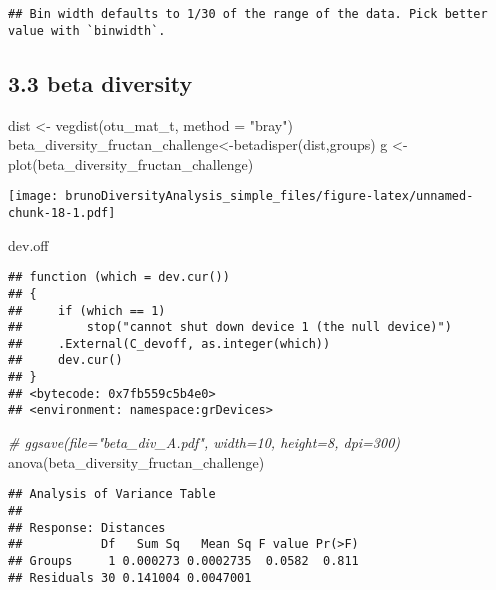 \documentclass[
]{article}
\newenvironment{Shaded}{\begin{snugshade}}{\end{snugshade}}
\newcommand{\AttributeTok}[1]{\textcolor[rgb]{0.77,0.63,0.00}{#1}}
\newcommand{\CommentTok}[1]{\textcolor[rgb]{0.56,0.35,0.01}{\textit{#1}}}
\newcommand{\FunctionTok}[1]{\textcolor[rgb]{0.00,0.00,0.00}{#1}}
\newcommand{\NormalTok}[1]{#1}
\newcommand{\OtherTok}[1]{\textcolor[rgb]{0.56,0.35,0.01}{#1}}
\newcommand{\StringTok}[1]{\textcolor[rgb]{0.31,0.60,0.02}{#1}}
\begin{document}
\begin{verbatim}
## Bin width defaults to 1/30 of the range of the data. Pick better value with `binwidth`.
\end{verbatim}

\hypertarget{beta-diversity-2}{%
\subsection{3.3 beta diversity}\label{beta-diversity-2}}

\begin{Shaded}
\begin{Highlighting}[]
\NormalTok{dist }\OtherTok{\textless{}{-}} \FunctionTok{vegdist}\NormalTok{(otu\_mat\_t, }\AttributeTok{method =} \StringTok{"bray"}\NormalTok{)}
\NormalTok{beta\_diversity\_fructan\_challenge}\OtherTok{\textless{}{-}}\FunctionTok{betadisper}\NormalTok{(dist,groups)}
\NormalTok{g }\OtherTok{\textless{}{-}} \FunctionTok{plot}\NormalTok{(beta\_diversity\_fructan\_challenge)}
\end{Highlighting}
\end{Shaded}

\texttt{[image: brunoDiversityAnalysis\_simple\_files/figure-latex/unnamed-chunk-18-1.pdf]}

\begin{Shaded}
\begin{Highlighting}[]
\NormalTok{dev.off}
\end{Highlighting}
\end{Shaded}

\begin{verbatim}
## function (which = dev.cur()) 
## {
##     if (which == 1) 
##         stop("cannot shut down device 1 (the null device)")
##     .External(C_devoff, as.integer(which))
##     dev.cur()
## }
## <bytecode: 0x7fb559c5b4e0>
## <environment: namespace:grDevices>
\end{verbatim}

\begin{Shaded}
\begin{Highlighting}[]
\CommentTok{\# ggsave(file="beta\_div\_A.pdf", width=10, height=8, dpi=300)}
\FunctionTok{anova}\NormalTok{(beta\_diversity\_fructan\_challenge)}
\end{Highlighting}
\end{Shaded}

\begin{verbatim}
## Analysis of Variance Table
## 
## Response: Distances
##           Df   Sum Sq   Mean Sq F value Pr(>F)
## Groups     1 0.000273 0.0002735  0.0582  0.811
## Residuals 30 0.141004 0.0047001
\end{verbatim}
\end{document}
